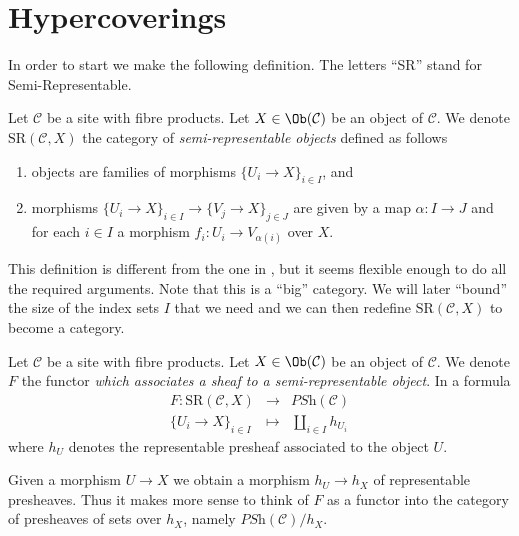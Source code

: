 \section{Hypercoverings}
\label{section-hypercoverings}

\noindent
In order to start we make the following definition.
The letters ``SR'' stand for Semi-Representable.

\begin{definition}
\label{definition-SR}
Let $\mathcal{C}$ be a site with fibre products.
Let $X \in \Ob(\mathcal{C})$ be an object of $\mathcal{C}$.
We denote $\text{SR}(\mathcal{C}, X)$ the category of
{\it semi-representable objects} defined as follows
\begin{enumerate}
\item objects are families of morphisms
$\{U_i \to X\}_{i \in I}$, and
\item morphisms $\{U_i \to X\}_{i \in I} \to
\{V_j \to X\}_{j \in J}$ are given by
a map $\alpha : I \to J$ and for each $i \in I$
a morphism $f_i : U_i \to V_{\alpha(i)}$ over $X$.
\end{enumerate}
\end{definition}

\noindent
This definition is different from the one in
\cite[Expos\'e V, Sec. 7]{SGA4}, but it seems flexible
enough to do all the required arguments.
Note that this is a ``big'' category. We will later
``bound'' the size of the index sets $I$ that we need
and we can then redefine $\text{SR}(\mathcal{C}, X)$
to become a category.

\begin{definition}
\label{definition-SR-F}
Let $\mathcal{C}$ be a site with fibre products.
Let $X \in \Ob(\mathcal{C})$ be an object of $\mathcal{C}$.
We denote $F$ the functor {\it which associates a sheaf to a
semi-representable object}. In a formula
\begin{eqnarray*}
F : \text{SR}(\mathcal{C}, X) & \longrightarrow & \textit{PSh}(\mathcal{C}) \\
\{U_i \to X\}_{i \in I} & \longmapsto & \amalg_{i\in I} h_{U_i}
\end{eqnarray*}
where $h_U$ denotes the representable presheaf associated to
the object $U$.
\end{definition}

\noindent
Given a morphism $U \to X$ we obtain a morphism
$h_U \to h_X$ of representable presheaves.
Thus it makes more sense to think of $F$ as a functor
into the category of presheaves of sets over $h_X$,
namely $\textit{PSh}(\mathcal{C})/h_X$.

